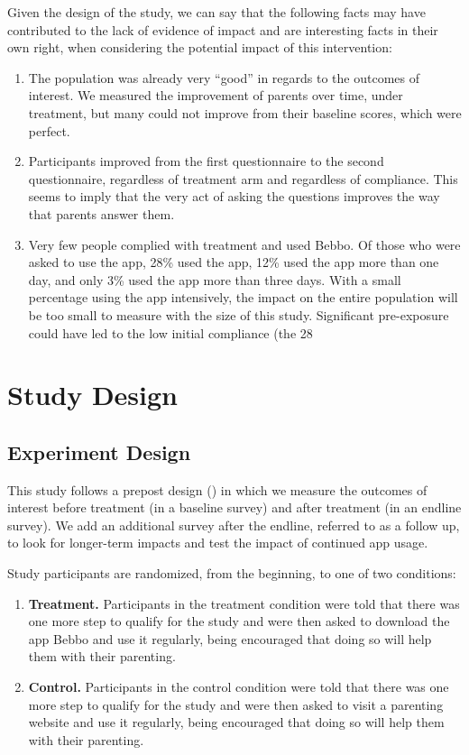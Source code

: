 \documentclass{article}
\begin{document}
Given the design of the study, we can say that the following facts may have contributed to the lack of evidence of impact and are interesting facts in their own right, when considering the potential impact of this intervention:


\begin{enumerate}
\item The population was already very “good” in regards to the outcomes of interest. We measured the improvement of parents over time, under treatment, but many could not improve from their baseline scores, which were perfect.
\item Participants improved from the first questionnaire to the second questionnaire, regardless of treatment arm and regardless of compliance. This seems to imply that the very act of asking the questions improves the way that parents answer them.
\item Very few people complied with treatment and used Bebbo. Of those who were asked to use the app, 28\% used the app, 12\% used the app more than one day, and only 3\% used the app more than three days. With a small percentage using the app intensively, the impact on the entire population will be too small to measure with the size of this study. Significant pre-exposure could have led to the low initial compliance (the 28%
\end{enumerate}




\section{Study Design}

\subsection*{Experiment Design}

This study follows a prepost design (\cite{Clifford2021}) in which we measure the outcomes of interest before treatment (in a baseline survey) and after treatment (in an endline survey). We add an additional survey after the endline, referred to as a follow up, to look for longer-term impacts and test the impact of continued app usage.

Study participants are randomized, from the beginning, to one of two conditions:

\begin{enumerate}
\item \textbf{Treatment.} Participants in the treatment condition were told that there was one more step to qualify for the study and were then asked to download the app Bebbo and use it regularly, being encouraged that doing so will help them with their parenting.
\item \textbf{Control.} Participants in the control condition were told that there was one more step to qualify for the study and were then asked to visit a parenting website and use it regularly, being encouraged that doing so will help them with their parenting.
\end{enumerate}
\end{document}
